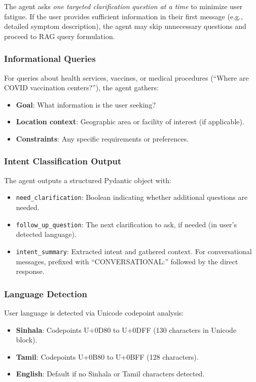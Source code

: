 \documentclass[11pt,a4paper]{article}
\begin{document}
The agent asks \textit{one targeted clarification question at a time} to minimize user fatigue. If the user provides sufficient information in their first message (e.g., detailed symptom description), the agent may skip unnecessary questions and proceed to RAG query formulation.

\subsubsection{Informational Queries}
For queries about health services, vaccines, or medical procedures (``Where are COVID vaccination centers?''), the agent gathers:
\begin{itemize}
    \item \textbf{Goal}: What information is the user seeking?
    \item \textbf{Location context}: Geographic area or facility of interest (if applicable).
    \item \textbf{Constraints}: Any specific requirements or preferences.
\end{itemize}

\subsubsection{Intent Classification Output}
The agent outputs a structured Pydantic object with:
\begin{itemize}
    \item \texttt{need\_clarification}: Boolean indicating whether additional questions are needed.
    \item \texttt{follow\_up\_question}: The next clarification to ask, if needed (in user's detected language).
    \item \texttt{intent\_summary}: Extracted intent and gathered context. For conversational messages, prefixed with ``CONVERSATIONAL:'' followed by the direct response.
\end{itemize}

\subsubsection{Language Detection}
User language is detected via Unicode codepoint analysis:
\begin{itemize}
    \item \textbf{Sinhala}: Codepoints U+0D80 to U+0DFF (130 characters in Unicode block).
    \item \textbf{Tamil}: Codepoints U+0B80 to U+0BFF (128 characters).
    \item \textbf{English}: Default if no Sinhala or Tamil characters detected.
\end{itemize}
\end{document}
